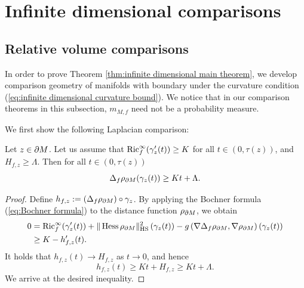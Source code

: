 \section{Infinite dimensional comparisons}\label{sec:Infinite dimensional comparisons}

\subsection{Relative volume comparisons}\label{sec:Relative volume comparisons}
In order to prove Theorem \ref{thm:infinite dimensional main theorem},
we develop comparison geometry of manifolds with boundary under the curvature condition (\ref{eq:infinite dimensional curvature bound}).
We notice that
in our comparison theorems in this subsection,
$m_{M,f}$ need not be a probability measure.

We first show the following Laplacian comparison:
\begin{lem}\label{lem:Laplacian comparison}
Let $z\in \partial M$.
Let us assume that
$\operatorname{Ric}^{\infty}_{f}(\gamma'_{z}(t))\geq K$ for all $t \in (0,\tau(z))$,
and $H_{f,z}\geq \Lambda$.
Then for all $t \in (0,\tau(z))$
\begin{equation*}
\Delta_{f} \rho_{\partial M}(\gamma_{z}(t))\geq Kt+\Lambda.
\end{equation*}
\end{lem}
\begin{proof}
Define $h_{f,z}:=\left(\Delta_{f}\rho_{\partial M}\right) \circ \gamma_{z}$.
By applying the Bochner formula (\ref{eq:Bochner formula}) to the distance function $\rho_{\partial M}$,
we obtain
\begin{align*}
0 &   =   \operatorname{Ric}^{\infty}_{f}(\gamma'_{z}(t))+\Vert \operatorname{Hess} \rho_{\partial M}\Vert^{2}_{\operatorname{HS}}\left(\gamma_{z}(t)\right)-g\left(\nabla \Delta_{f}\rho_{\partial M},\nabla \rho_{\partial M}  \right)(\gamma_{z}(t))\\
   &\geq K-h'_{f,z}(t).
\end{align*}
It holds that $h_{f,z}(t)\to H_{f,z}$ as $t\to 0$,
and hence
\begin{equation*}
h_{f,z}(t) \geq Kt +H_{f,z}\geq Kt +\Lambda.
\end{equation*}
We arrive at the desired inequality.
\end{proof}

